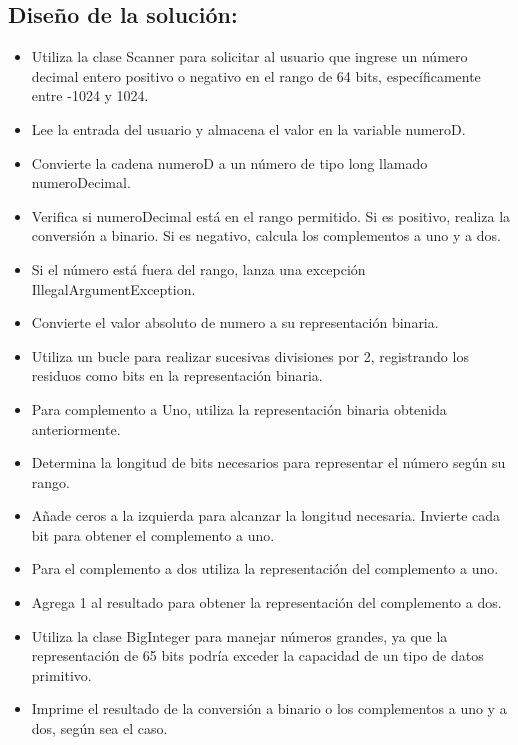 \subsection{\textbf{Diseño de la solución:}}
\begin{itemize}
    \item Utiliza la clase Scanner para solicitar al usuario que ingrese un número decimal entero positivo o negativo en el rango de 64 bits, específicamente entre -1024 y 1024.
    \item Lee la entrada del usuario y almacena el valor en la variable numeroD.
    
    \item Convierte la cadena numeroD a un número de tipo long llamado numeroDecimal.
    \item Verifica si numeroDecimal está en el rango permitido. Si es positivo, realiza la conversión a binario. Si es negativo, calcula los complementos a uno y a dos.
    \item Si el número está fuera del rango, lanza una excepción IllegalArgumentException.
    
    \item Convierte el valor absoluto de numero a su representación binaria.
    \item Utiliza un bucle para realizar sucesivas divisiones por 2, registrando los residuos como bits en la representación binaria.
    
    \item Para complemento a Uno, utiliza la representación binaria obtenida anteriormente.
    
    \item Determina la longitud de bits necesarios para representar el número según su rango.
    
    \item Añade ceros a la izquierda para alcanzar la longitud necesaria.
    Invierte cada bit para obtener el complemento a uno.
    
    \item Para el complemento a dos utiliza la representación del complemento a uno.
    
    \item Agrega 1 al resultado para obtener la representación del complemento a dos.
    
    \item Utiliza la clase BigInteger para manejar números grandes, ya que la representación de 65 bits podría exceder la capacidad de un tipo de datos primitivo.
    
    \item Imprime el resultado de la conversión a binario o los complementos a uno y a dos, según sea el caso.
    \end{itemize}

